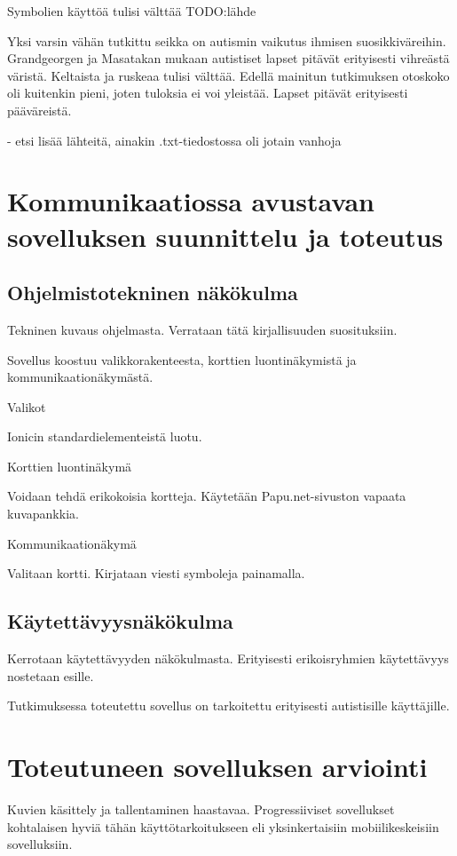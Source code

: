 \documentclass[utf8]{gradu3}
\begin{document}
Symbolien käyttöä tulisi välttää TODO:lähde

Yksi varsin vähän tutkittu seikka on autismin vaikutus ihmisen suosikkiväreihin. Grandgeorgen ja Masatakan \parencite[]{color-preference-autism} mukaan autistiset lapset pitävät erityisesti vihreästä väristä. Keltaista ja ruskeaa tulisi välttää. Edellä mainitun tutkimuksen otoskoko oli kuitenkin pieni, joten tuloksia ei voi yleistää. Lapset pitävät erityisesti pääväreistä.

- etsi lisää lähteitä, ainakin .txt-tiedostossa oli jotain vanhoja

\chapter{Kommunikaatiossa avustavan sovelluksen suunnittelu ja toteutus}

\section{Ohjelmistotekninen näkökulma}
Tekninen kuvaus ohjelmasta. Verrataan tätä kirjallisuuden suosituksiin.

Sovellus koostuu valikkorakenteesta, korttien luontinäkymistä ja kommunikaationäkymästä.

Valikot

Ionicin standardielementeistä luotu.

Korttien luontinäkymä

Voidaan tehdä erikokoisia kortteja. Käytetään Papu.net-sivuston vapaata kuvapankkia.

Kommunikaationäkymä

Valitaan kortti. Kirjataan viesti symboleja painamalla.

\section{Käytettävyysnäkökulma}

Kerrotaan käytettävyyden näkökulmasta. Erityisesti erikoisryhmien käytettävyys nostetaan esille.

Tutkimuksessa toteutettu sovellus on tarkoitettu erityisesti autistisille käyttäjille.

\chapter{Toteutuneen sovelluksen arviointi}

Kuvien käsittely ja tallentaminen haastavaa. Progressiiviset sovellukset kohtalaisen hyviä tähän käyttötarkoitukseen eli yksinkertaisiin mobiilikeskeisiin sovelluksiin.
\end{document}
